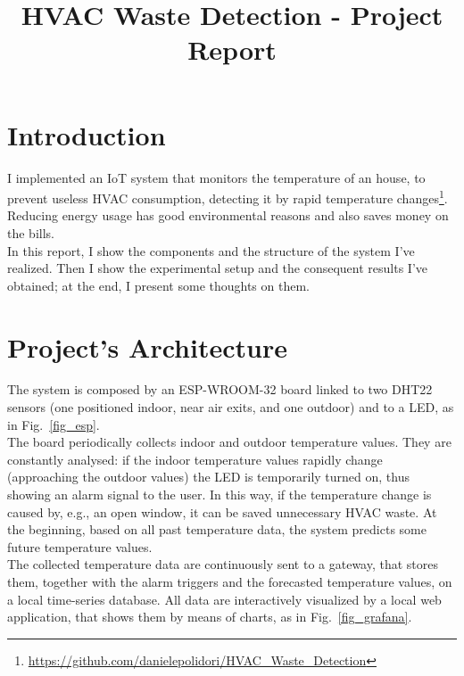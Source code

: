 \documentclass[conference]{IEEEtran}
\begin{document}
\title{HVAC Waste Detection - Project Report}

\author{
}

\maketitle


\section{Introduction}
I implemented an IoT system that monitors the temperature of an house, to prevent useless HVAC consumption, detecting it by rapid temperature changes\footnote{\url{https://github.com/danielepolidori/HVAC_Waste_Detection}}. Reducing energy usage has good environmental reasons and also saves money on the bills.\\
In this report, I show the components and the structure of the system I've realized. Then I show the experimental setup and the consequent results I've obtained; at the end, I present some thoughts on them.


\section{Project’s Architecture}
The system is composed by an ESP-WROOM-32 board linked to two DHT22 sensors (one positioned indoor, near air exits, and one outdoor) and to a LED, as in Fig.~\ref{fig_esp}.\\
The board periodically collects indoor and outdoor temperature values. They are constantly analysed: if the indoor temperature values rapidly change (approaching the outdoor values) the LED is temporarily turned on, thus showing an alarm signal to the user. In this way, if the temperature change is caused by, e.g., an open window, it can be saved unnecessary HVAC waste. At the beginning, based on all past temperature data, the system predicts some future temperature values.\\
The collected temperature data are continuously sent to a gateway, that stores them, together with the alarm triggers and the forecasted temperature values, on a local time-series database. All data are interactively visualized by a local web application, that shows them by means of charts, as in Fig.~\ref{fig_grafana}.
\end{document}
